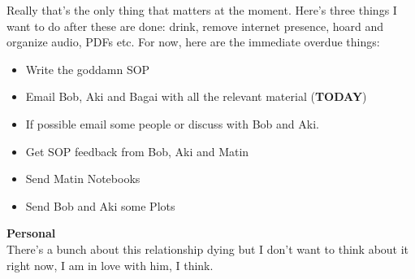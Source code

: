 \noindent {}

Really that's the only thing that matters at the moment. Here's three things I want to do after these are done: drink, remove internet presence, hoard and organize audio, PDFs etc. For now, here are the immediate overdue things:
\begin{itemize}
    \item Write the goddamn SOP
    \item Email Bob, Aki and Bagai with all the relevant material (\textbf{TODAY})
    \item If possible email some people or discuss with Bob and Aki. 
    \item Get SOP feedback from Bob, Aki and Matin
    \item Send Matin Notebooks
    \item Send Bob and Aki some Plots
\end{itemize}

\textbf{Personal}\\
There's a bunch about this relationship dying but I don't want to think about it right now, I am in love with him, I think.\\
